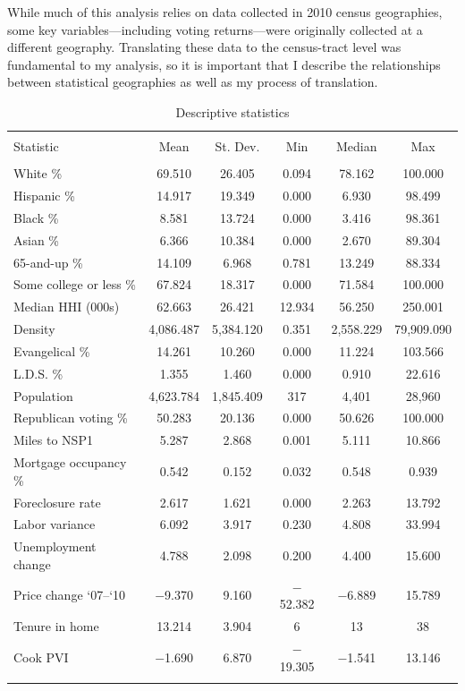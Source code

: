 \documentclass[12pt,oneside]{psthesis}
\begin{document}
While much of this analysis relies on data collected in 2010 census geographies, some key variables---including voting returns---were originally collected at a different geography.
Translating these data to the census-tract level was fundamental to my analysis, so it is important that I describe the relationships between statistical geographies as well as my process of translation.
\begin{table}[!htbp] \centering 
  \caption{Descriptive statistics} 
  \label{tab:summary} 
\begin{tabular}{@{\extracolsep{5pt}}lccccc} 
\\[-1.8ex]\hline 
\hline \\[-1.8ex] 
Statistic & \multicolumn{1}{c}{Mean} & \multicolumn{1}{c}{St. Dev.} & \multicolumn{1}{c}{Min} & \multicolumn{1}{c}{Median} & \multicolumn{1}{c}{Max} \\ 
\hline \\[-1.8ex] 
White \% & 69.510 & 26.405 & 0.094 & 78.162 & 100.000 \\ 
Hispanic \% & 14.917 & 19.349 & 0.000 & 6.930 & 98.499 \\ 
Black \% & 8.581 & 13.724 & 0.000 & 3.416 & 98.361 \\ 
Asian \% & 6.366 & 10.384 & 0.000 & 2.670 & 89.304 \\ 
65-and-up \% & 14.109 & 6.968 & 0.781 & 13.249 & 88.334 \\ 
Some college or less \% & 67.824 & 18.317 & 0.000 & 71.584 & 100.000 \\ 
Median HHI (000s) & 62.663 & 26.421 & 12.934 & 56.250 & 250.001 \\ 
Density & 4,086.487 & 5,384.120 & 0.351 & 2,558.229 & 79,909.090 \\ 
Evangelical \% & 14.261 & 10.260 & 0.000 & 11.224 & 103.566 \\ 
L.D.S. \% & 1.355 & 1.460 & 0.000 & 0.910 & 22.616 \\ 
Population & 4,623.784 & 1,845.409 & 317 & 4,401 & 28,960 \\ 
Republican voting \% & 50.283 & 20.136 & 0.000 & 50.626 & 100.000 \\ 
Miles to NSP1 & 5.287 & 2.868 & 0.001 & 5.111 & 10.866 \\ 
Mortgage occupancy \% & 0.542 & 0.152 & 0.032 & 0.548 & 0.939 \\ 
Foreclosure rate & 2.617 & 1.621 & 0.000 & 2.263 & 13.792 \\ 
Labor variance & 6.092 & 3.917 & 0.230 & 4.808 & 33.994 \\ 
Unemployment change & 4.788 & 2.098 & 0.200 & 4.400 & 15.600 \\ 
Price change `07--`10 & $-$9.370 & 9.160 & $-$52.382 & $-$6.889 & 15.789 \\ 
Tenure in home & 13.214 & 3.904 & 6 & 13 & 38 \\ 
Cook PVI & $-$1.690 & 6.870 & $-$19.305 & $-$1.541 & 13.146 \\ 
\hline \\[-1.8ex] 
\end{tabular} 
\end{table}
\end{document}
